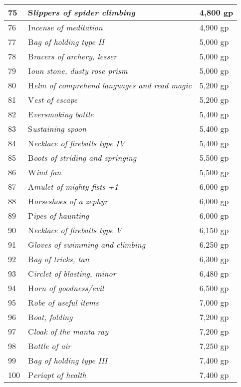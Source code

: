 \documentclass{article}
\begin{document}
\begin{tabular}{|>{\raggedright}p{14pt}|>{\raggedright}p{191pt}|>{\raggedright}p{55pt}|}
\hline
75 & S\textit{lippers of spider climbing} & 4,800 gp\tabularnewline
\hline
76 & I\textit{ncense of meditation} & 4,900 gp\tabularnewline
\hline
77 & B\textit{ag of holding type II} & 5,000 gp\tabularnewline
\hline
78 & B\textit{racers of archery, lesser} & 5,000 gp\tabularnewline
\hline
79 & I\textit{oun stone, dusty rose prism} & 5,000 gp\tabularnewline
\hline
80 & H\textit{elm of comprehend languages and read magic} & 5,200 gp\tabularnewline
\hline
81 & V\textit{est of escape} & 5,200 gp\tabularnewline
\hline
82 & E\textit{versmoking bottle} & 5,400 gp\tabularnewline
\hline
83 & S\textit{ustaining spoon} & 5,400 gp\tabularnewline
\hline
84 & N\textit{ecklace of fireballs type IV} & 5,400 gp\tabularnewline
\hline
85 & B\textit{oots of striding and springing} & 5,500 gp\tabularnewline
\hline
86 & W\textit{ind fan} & 5,500 gp\tabularnewline
\hline
87 & A\textit{mulet of mighty fists +1} & 6,000 gp\tabularnewline
\hline
88 & H\textit{orseshoes of a zephyr} & 6,000 gp\tabularnewline
\hline
89 & P\textit{ipes of haunting} & 6,000 gp\tabularnewline
\hline
90 & N\textit{ecklace of fireballs type V} & 6,150 gp\tabularnewline
\hline
91 & G\textit{loves of swimming and climbing} & 6,250 gp\tabularnewline
\hline
92 & B\textit{ag of tricks, tan} & 6,300 gp\tabularnewline
\hline
93 & C\textit{irclet of blasting, minor} & 6,480 gp\tabularnewline
\hline
94 & H\textit{orn of goodness/evil} & 6,500 gp\tabularnewline
\hline
95 & R\textit{obe of useful items} & 7,000 gp\tabularnewline
\hline
96 & B\textit{oat, folding} & 7,200 gp\tabularnewline
\hline
97 & C\textit{loak of the manta ray} & 7,200 gp\tabularnewline
\hline
98 & B\textit{ottle of air} & 7,250 gp\tabularnewline
\hline
99 & B\textit{ag of holding type III} & 7,400 gp\tabularnewline
\hline
100 & P\textit{eriapt of health} & 7,400 gp\tabularnewline
\hline
\end{tabular}
\end{document}
